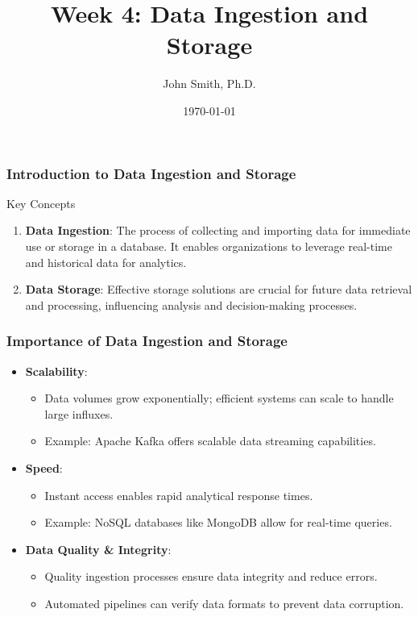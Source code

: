 \documentclass[aspectratio=169]{beamer}
\title[Week 4: Data Ingestion and Storage]{Week 4: Data Ingestion and Storage}
\author[J. Smith]{John Smith, Ph.D.}
\institute[University Name]{Department of Computer Science\\ University Name}
\date{\today}
\begin{document}
\frame{\titlepage}

\begin{frame}[fragile]
    \frametitle{Introduction to Data Ingestion and Storage}
    \begin{block}{Key Concepts}
        \begin{enumerate}
            \item \textbf{Data Ingestion}: The process of collecting and importing data for immediate use or storage in a database. It enables organizations to leverage real-time and historical data for analytics.
            \item \textbf{Data Storage}: Effective storage solutions are crucial for future data retrieval and processing, influencing analysis and decision-making processes.
        \end{enumerate}
    \end{block}
\end{frame}

\begin{frame}[fragile]
    \frametitle{Importance of Data Ingestion and Storage}
    \begin{itemize}
        \item \textbf{Scalability}:
            \begin{itemize}
                \item Data volumes grow exponentially; efficient systems can scale to handle large influxes.
                \item Example: Apache Kafka offers scalable data streaming capabilities.
            \end{itemize}
        
        \item \textbf{Speed}:
            \begin{itemize}
                \item Instant access enables rapid analytical response times.
                \item Example: NoSQL databases like MongoDB allow for real-time queries.
            \end{itemize}
        
        \item \textbf{Data Quality \& Integrity}:
            \begin{itemize}
                \item Quality ingestion processes ensure data integrity and reduce errors.
                \item Automated pipelines can verify data formats to prevent data corruption.
            \end{itemize}
    \end{itemize}
\end{frame}
\end{document}
